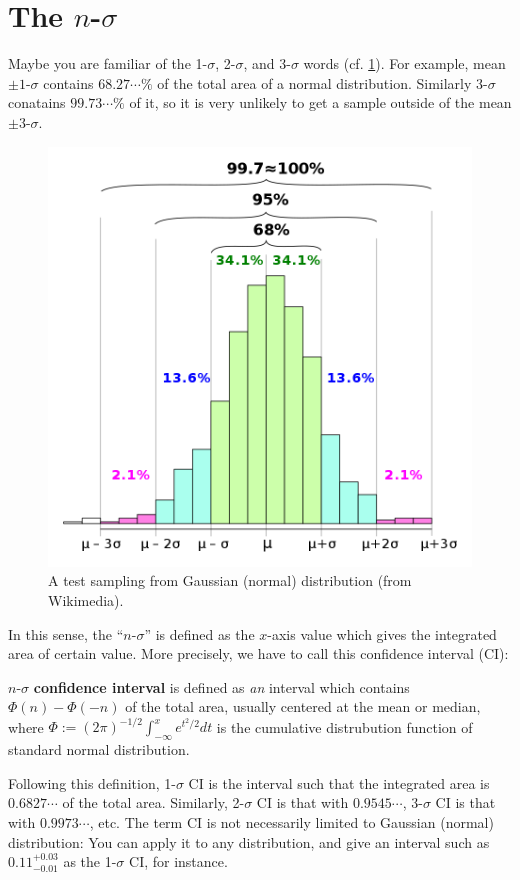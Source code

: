 \section{The $ n $-$ \sigma $} \label{sec: n-sigma notation}
Maybe you are familiar of the 1-$ \sigma $, 2-$ \sigma $, and 3-$ \sigma $ words (cf. \cref{fig:nsigmawiki}). For example, mean $ \pm 1$-$ \sigma $ contains $ 68.27\cdots \% $ of the total area of a normal distribution. Similarly 3-$ \sigma $ conatains $ 99.73\cdots \% $ of it, so it is very unlikely to get a sample outside of the mean $ \pm 3 $-$ \sigma $. 

\begin{figure}[ht!]
  \centering
  \includegraphics[width=0.5\linewidth]{figs/nsigma_wiki}
  \caption{A test sampling from Gaussian (normal) distribution (from Wikimedia).}
  \label{fig:nsigmawiki}
\end{figure}

In this sense, the ``$ n $-$ \sigma $'' is defined as the $ x $-axis value which gives the integrated area of certain value. More precisely, we have to call this confidence interval (CI):

\begin{defn}
  $ n $-$ \sigma $ \textbf{confidence interval} is defined as \textit{an} interval which contains $ \Phi(n) - \Phi(-n) $ of the total area, usually centered at the mean or median, where $ \Phi := (2\pi)^{-1/2} \int_{-\infty}^{x} e^{t^2/2} dt $ is the cumulative distrubution function of standard normal distribution. 
\end{defn}

Following this definition, 1-$ \sigma $ CI is the interval such that the integrated area is $ 0.6827\cdots $ of the total area. Similarly, 2-$ \sigma $ CI is that with $ 0.9545\cdots $, 3-$ \sigma $ CI is that with $ 0.9973\cdots $, etc. The term CI is not necessarily limited to Gaussian (normal) distribution: You can apply it to any distribution, and give an interval such as $ 0.11 ^{+0.03}_{-0.01} $ as the 1-$ \sigma $ CI, for instance.

